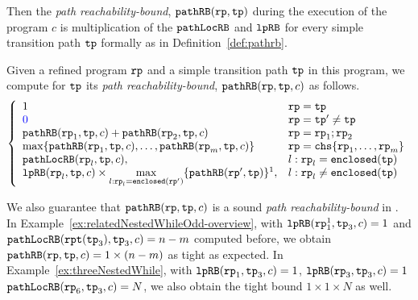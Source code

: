 Then the \emph{path reachability-bound}, $\mathtt{pathRB}(\mathtt{rp}, \mathtt{tp})$ during the execution of the program $c$ is multiplication of the $\mathtt{pathLocRB}$ and $\mathtt{lpRB}$ for every simple transition path $\mathtt{tp}$ formally as in Definition~\ref{def:pathrb}.
%
\begin{defn}
  \label{def:pathrb}
  Given a refined program $\mathtt{rp}$ and a simple transition path $\mathtt{tp}$ in this program, 
  we compute for $\mathtt{tp}$ its \emph{path reachability-bound}, $\mathtt{pathRB}(\mathtt{rp}, \mathtt{tp}, c)$
  as follows. 
{\small 
\[
  \left\{ 
  \begin{array}{ll}
    1  & \rprog = \tpath\\
    \highlight{0} & \rprog = \tpath' \neq \tpath\\
    \inoutB(\rprog_1, \tpath, c) + \inoutB(\rprog_2, \tpath, c) & \rprog = \rprog_1;\rprog_2 \\
    \max\left\{ \inoutB(\rprog_1, \tpath, c), \ldots, \inoutB(\rprog_m, \tpath, c) \right\} 
    & \rprog = \rpchoose{\rprog_1, \ldots, \rprog_m } \\
    \outinB(\rprog_l, \tpath, c), & l: \rprog_l = \kw{enclosed}(\tpath) \\
    \lpchB(\rprog_l, \tpath , c)
    \times \max\limits_{l:\rprog_l = \kw{enclosed}(\rprog')}
   \{\inoutB(\rprog', \tpath)\} \footnotemark, & l: \rprog_l \neq \kw{enclosed}(\tpath) \\
  \end{array}
  \right.
  \]
 }
 \end{defn}

We also guarantee that $\mathtt{pathRB}(\mathtt{rp}, \mathtt{tp}, c)$ is a sound \emph{path reachability-bound}
in .
%
In Example~\ref{ex:relatedNestedWhileOdd-overview}, with $\mathtt{lpRB}(\mathtt{rp}_1^1, \mathtt{tp}_3, c) = 1$ and
$\mathtt{pathLocRB}(\mathtt{rpt}(\mathtt{tp}_3), \mathtt{tp}_3, c) = n - m$ computed before,
we obtain $\mathtt{pathRB}(\mathtt{rp}, \mathtt{tp}, c) = 1 \times  (n - m)$ as tight as expected.
In Example~\ref{ex:threeNestedWhile}, with $\mathtt{lpRB}(\mathtt{rp}_1, \mathtt{tp}_3, c) = 1$,
$\mathtt{lpRB}(\mathtt{rp}_3, \mathtt{tp}_3, c) = 1$
$\mathtt{pathLocRB}(\mathtt{rp}_6, \mathtt{tp}_3, c) = N$,
we also obtain the tight bound $1 \times 1 \times  N$ as well.
